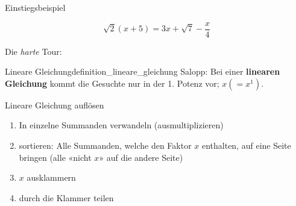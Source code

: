 \begin{beispiel}{Einstiegsbeispiel}{}

$$\sqrt{2}(x+5) = 3x + \sqrt{7} - \frac{x}4$$

  Die \textit{harte} Tour:
  

\end{beispiel}


\begin{bemerkung}{Lineare Gleichung}{definition_lineare_gleichung}
  Salopp: Bei einer \textbf{linearen Gleichung} kommt die Gesuchte nur
  in der 1. Potenz vor; \zB $x (= x^1)$.
\end{bemerkung}
\newpage

\begin{rezept}{Lineare Gleichung auflösen}{}
  \begin{enumerate}
    \item In einzelne Summanden verwandeln (ausmultiplizieren)
  \item sortieren: Alle Summanden, welche den Faktor $x$ enthalten, auf eine Seite bringen (alle «nicht $x$» auf die andere Seite)
  \item $x$ ausklammern
  \item durch die Klammer teilen
    \end{enumerate} 
  \end{rezept}
\newpage


